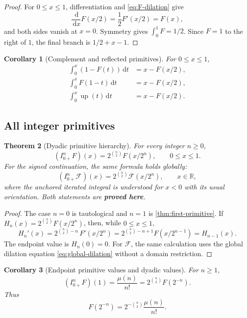 \documentclass[11pt]{article}
\newcommand{\statusproved}{\textcolor{statusgreen}{\textbf{proved here}}}
\newtheorem{theorem}{Theorem}[section]
\newtheorem{corollary}[theorem]{Corollary}
\theoremstyle{definition}
\theoremstyle{remark}
\newcommand{\R}{\mathbb R}
\newcommand{\dd}{\,\mathrm d}
\newcommand{\Up}{\operatorname{up}}
\newcommand{\extF}{\mathcal F}
\begin{document}
\begin{proof}
For $0\le x\le1$, differentiation and \cref{eq:F-dilation} give
\[
 \frac{\dd}{\dd x}F(x/2)=\frac12F'(x/2)=F(x),
\]
and both sides vanish at $x=0$.  Symmetry gives $\int_0^1F=1/2$.  Since $F=1$ to the
right of $1$, the final branch is $1/2+x-1$.
\end{proof}

\begin{corollary}[Complement and reflected primitives]
For $0\le x\le1$,
\begin{align}
 \int_0^x(1-F(t))\dd t
 &=x-F(x/2),\label{eq:complement-primitive}\\
 \int_0^xF(1-t)\dd t
 &=x-F(x/2),\label{eq:reflected-primitive}\\
 \int_0^x\Up(t)\dd t
 &=x-F(x/2).\label{eq:up-positive-primitive}
\end{align}
\end{corollary}

\subsection{All integer primitives}

\begin{theorem}[Dyadic primitive hierarchy]
\label{thm:integer-primitives}
For every integer $n\ge0$,
\begin{equation}
 (I_{0+}^{n}F)(x)=2^{\binom n2}F(x/2^n),
 \qquad 0\le x\le1.
 \label{eq:F-n-primitive}
\end{equation}
For the signed continuation, the same formula holds globally:
\begin{equation}
 (I_{0+}^{n}\extF)(x)=2^{\binom n2}\extF(x/2^n),
 \qquad x\in\R,
 \label{eq:global-n-primitive}
\end{equation}
where the anchored iterated integral is understood for $x<0$ with its usual orientation.
Both statements are \statusproved.
\end{theorem}

\begin{proof}
The case $n=0$ is tautological and $n=1$ is \cref{thm:first-primitive}.  If
$H_n(x)=2^{\binom n2}F(x/2^n)$, then, while $0\le x\le1$,
\[
 H_n'(x)=2^{\binom n2-n}\,F'(x/2^n)
 =2^{\binom n2-n+1}F(x/2^{n-1})
 =H_{n-1}(x).
\]
The endpoint value is $H_n(0)=0$.  For $\extF$, the same calculation uses the global
dilation equation \cref{eq:global-dilation} without a domain restriction.
\end{proof}

\begin{corollary}[Endpoint primitive values and dyadic values]
\label{cor:primitive-endpoints}
For $n\ge1$,
\begin{equation}
 (I_{0+}^{n}F)(1)=\frac{\mu(n)}{n!}
 =2^{\binom n2}F(2^{-n}).
 \label{eq:primitive-endpoint-moment}
\end{equation}
Thus
\begin{equation}
 F(2^{-n})=2^{-\binom n2}\frac{\mu(n)}{n!}.
 \label{eq:dyadic-moment-basic}
\end{equation}
\end{corollary}
\end{document}
